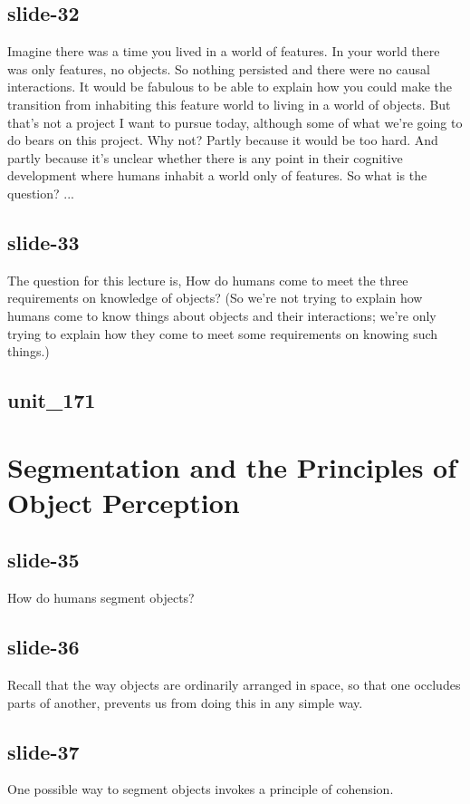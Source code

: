 \documentclass[12pt,\papersize]{extarticle}
\begin{document}
 
\subsection{slide-32}
Imagine there was a time you lived in a world of features. In your world there was only features, no objects.
So nothing persisted and there were no causal interactions.
It would be fabulous to be able to explain how you could make the transition from inhabiting this feature world to living in a world of objects.
But that's not a project I want to pursue today, although some of what we're going to do bears on this project.
Why not? Partly because it would be too hard. And partly because it's unclear whether there is any point in their cognitive development where humans inhabit a world only of features.
So what is the question? ...
 
 
\subsection{slide-33}
The question for this lecture is, How do humans come to meet the three requirements on knowledge of objects?
(So we're not trying to explain how humans come to know things about objects and their interactions; we're only trying to explain how they come to meet some requirements on knowing such things.)
 
 
\subsection{unit\_171}
 
\section{Segmentation and the Principles of Object Perception}
 
 
\subsection{slide-35}
How do humans segment objects?
 
 
\subsection{slide-36}
Recall that the way objects are ordinarily arranged in space, so that one occludes parts of another, prevents us from doing this in any simple way.
 
 
\subsection{slide-37}
One possible way to segment objects invokes a principle of cohension.
 
\end{document}
